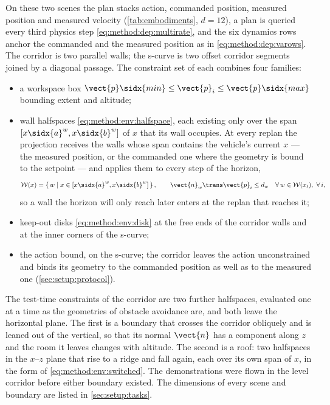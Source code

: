 On these two scenes the plan stacks action, commanded position, measured position and measured velocity
(\autoref{tab:embodiments}, $d = 12$), a plan is queried every third physics step
\eqref{eq:method:dep:multirate}, and the six dynamics rows anchor the commanded and the measured position
as in \eqref{eq:method:dep:varows}. The corridor is two parallel walls; the s-curve is two offset corridor
segments joined by a diagonal passage. The constraint set of each combines four families:
\begin{itemize}
  \item a workspace box $\vect{p}\sidx{min}\le\vect{p}_{i}\le\vect{p}\sidx{max}$ bounding extent and
    altitude;
  \item wall halfspaces \eqref{eq:method:env:halfspace}, each existing only over the span
    $[x\sidx{a}^{w},x\sidx{b}^{w}]$ of $x$ that its wall occupies. At every replan the projection receives
    the walls whose span contains the vehicle's current $x$ --- the measured position, or the commanded one
    where the geometry is bound to the setpoint --- and applies them to every step of the horizon,
    \begin{equation}\label{eq:method:env:switched}
      \mathcal{W}(x) = \left\{\,w \;\middle|\; x \in [x\sidx{a}^{w},x\sidx{b}^{w}]\,\right\},
      \qquad
      \vect{n}_{w}\trans\vect{p}_{i} \le d_{w}
      \quad \forall\, w \in \mathcal{W}(x_{t}),\ \forall\, i ,
    \end{equation}
    so a wall the horizon will only reach later enters at the replan that reaches it;
  \item keep-out disks \eqref{eq:method:env:disk} at the free ends of the corridor walls and at the
    inner corners of the s-curve;
  \item the action bound, on the s-curve; the corridor leaves the action unconstrained and binds its
    geometry to the commanded position as well as to the measured one (\autoref{sec:setup:protocol}).
\end{itemize}
The test-time constraints of the corridor are two further halfspaces, evaluated one at a time as the
geometries of obstacle avoidance are, and both leave the horizontal plane. The first is a boundary that
crosses the corridor obliquely and is leaned out of the vertical, so that its normal $\vect{n}$ has a
component along $z$ and the room it leaves changes with altitude. The second is a roof: two halfspaces
in the $x$--$z$ plane that rise to a ridge and fall again, each over its own span of $x$, in the form of
\eqref{eq:method:env:switched}. The demonstrations were flown in the level corridor before either
boundary existed. The dimensions of every scene and boundary are listed in \autoref{sec:setup:tasks}.

